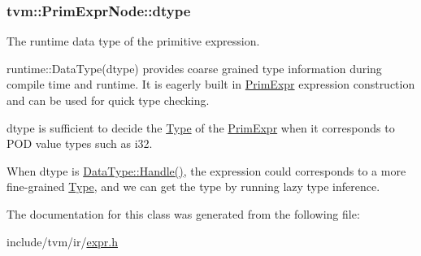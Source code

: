 \subsubsection[{\texorpdfstring{dtype}{dtype}}]{ tvm\+::\+Prim\+Expr\+Node\+::dtype}\hypertarget{classtvm_1_1PrimExprNode_a95af9234514ec5f11355db41524be7f9}{}\label{classtvm_1_1PrimExprNode_a95af9234514ec5f11355db41524be7f9}


The runtime data type of the primitive expression. 

runtime\+::\+Data\+Type(dtype) provides coarse grained type information during compile time and runtime. It is eagerly built in \hyperlink{classtvm_1_1PrimExpr}{Prim\+Expr} expression construction and can be used for quick type checking.

dtype is sufficient to decide the \hyperlink{classtvm_1_1Type}{Type} of the \hyperlink{classtvm_1_1PrimExpr}{Prim\+Expr} when it corresponds to P\+OD value types such as i32.

When dtype is \hyperlink{classtvm_1_1runtime_1_1DataType_aebad9f7235dd20af649fb5c2113797b8}{Data\+Type\+::\+Handle()}, the expression could corresponds to a more fine-\/grained \hyperlink{classtvm_1_1Type}{Type}, and we can get the type by running lazy type inference. 

The documentation for this class was generated from the following file\+:\begin{DoxyCompactItemize}
\item 
include/tvm/ir/\hyperlink{ir_2expr_8h}{expr.\+h}\end{DoxyCompactItemize}
